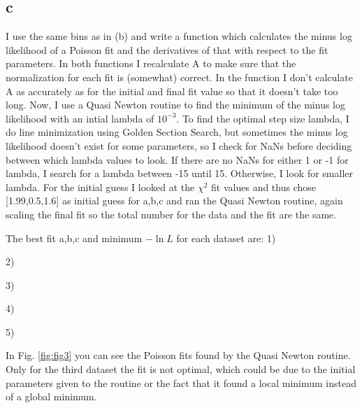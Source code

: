\subsection*{c}

I use the same bins as in (b) and write a function which calculates the minus log likelihood of a Poisson fit and the derivatives of that with respect to the fit parameters. In both functions I recalculate A to make sure that the normalization for each fit is (somewhat) correct. In the function I don't calculate A as accurately as for the initial and final fit value so that it doesn't take too long. 
Now, I use a Quasi Newton routine to find the minimum of the minus log likelihood with an intial lambda of $10^{-3}$. To find the optimal step size lambda, I do line minimization using Golden Section Search, but sometimes the minus log likelihood doesn't exist for some parameters, so I check for NaNs before deciding between which lambda values to look. If there are no NaNs for either 1 or -1 for lambda, I search for a lambda between -15 until 15. Otherwise, I look for smaller lambda. 
For the initial guess I looked at the $\chi^2$ fit values and thus chose [1.99,0.5,1.6] as initial guess for a,b,c and ran the Quasi Newton routine, again scaling the final fit so the total number for the data and the fit are the same.

The best fit a,b,c and minimum $-\ln L$ for each dataset are: 1)

2)

3)

4)

5)



In Fig. \ref{fig:fig3} you can see the Poisson fits found by the Quasi Newton routine. Only for the third dataset the fit is not optimal, which could be due to the initial parameters given to the routine or the fact that it found a local minimum instead of a global minimum. 

